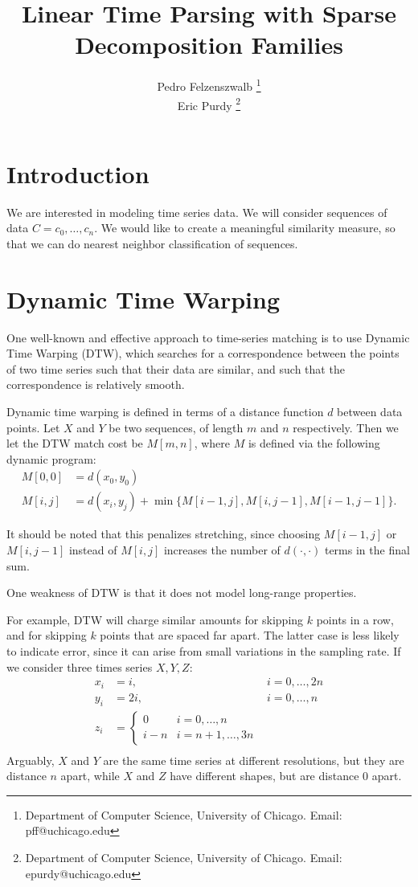 \documentclass{article}
\title{Linear Time Parsing with Sparse Decomposition Families}
\author{Pedro Felzenszwalb \footnote{Department of Computer Science, University of Chicago. Email: pff@uchicago.edu}\\
Eric Purdy \footnote{Department of Computer Science, University of Chicago. Email: epurdy@uchicago.edu}}
\begin{document}
\maketitle

\section{Introduction}
We are interested in modeling time series data. We will consider
sequences of data $C=c_0, \dots, c_n$. We would like to create a
meaningful similarity measure, so that we can do nearest neighbor
classification of sequences. 

\section{Dynamic Time Warping}

One well-known and effective approach to time-series matching is to
use Dynamic Time Warping (DTW), which searches for a correspondence
between the points of two time series such that their data are
similar, and such that the correspondence is relatively smooth.

Dynamic time warping is defined in terms of a distance function $d$
between data points. Let $X$ and $Y$ be two sequences, of length $m$
and $n$ respectively. Then we let the DTW match cost be
$M[m,n]$, where $M$ is defined via the following dynamic program:
\begin{align*}
M[0,0] &= d(x_0, y_0) \\
M[i,j] &= d(x_i,y_j) + \min \{ M[i-1,j], M[i,j-1], M[i-1,j-1]\}.
\end{align*}

It should be noted that this penalizes stretching, since choosing
$M[i-1,j]$ or $M[i,j-1]$ instead of $M[i,j]$ increases the number of
  $d(\cdot,\cdot)$ terms in the final sum.

One weakness of DTW is that it does not model long-range
properties. 

\begin{ex}
\label{stretch-problem}
For example, DTW will charge similar amounts for skipping
$k$ points in a row, and for skipping $k$ points that are spaced far
apart. The latter case is less likely to indicate error, since it can
arise from small variations in the sampling rate. If we consider three
times series $X,Y,Z$:
\begin{align*}
x_i &= i, &i=0, \dots, 2n\\
y_i &= 2i, &i=0, \dots, n\\
z_i &= \begin{cases} 0 & i=0,\dots, n\\ i-n & i=n+1, \dots, 3n\end{cases}\\
\end{align*}
Arguably, $X$ and $Y$ are the same time series at different
resolutions, but they are distance $n$ apart, while $X$ and $Z$ have
different shapes, but are distance $0$ apart.
\end{ex}
\end{document}
